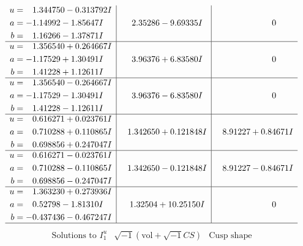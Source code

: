 \documentclass[1p]{elsarticle_modified}
\theoremstyle{definition}
\newcommand{\I}{\sqrt{-1}}
\begin{document}
$$\begin{array}{c|c|c}
\begin{aligned}
u &= \phantom{-}1.344750 - 0.313792 I \\
a &= -1.14992 - 1.85647 I \\
b &= \phantom{-}1.16266 - 1.37871 I\end{aligned}
 & \phantom{-}2.35286 - 9.69335 I & \phantom{-0.000000 } 0 \\ \hline\begin{aligned}
u &= \phantom{-}1.356540 + 0.264667 I \\
a &= -1.17529 + 1.30491 I \\
b &= \phantom{-}1.41228 + 1.12611 I\end{aligned}
 & \phantom{-}3.96376 + 6.83580 I & \phantom{-0.000000 } 0 \\ \hline\begin{aligned}
u &= \phantom{-}1.356540 - 0.264667 I \\
a &= -1.17529 - 1.30491 I \\
b &= \phantom{-}1.41228 - 1.12611 I\end{aligned}
 & \phantom{-}3.96376 - 6.83580 I & \phantom{-0.000000 } 0 \\ \hline\begin{aligned}
u &= \phantom{-}0.616271 + 0.023761 I \\
a &= \phantom{-}0.710288 + 0.110865 I \\
b &= \phantom{-}0.698856 + 0.247047 I\end{aligned}
 & \phantom{-}1.342650 + 0.121848 I & \phantom{-}8.91227 + 0.84671 I \\ \hline\begin{aligned}
u &= \phantom{-}0.616271 - 0.023761 I \\
a &= \phantom{-}0.710288 - 0.110865 I \\
b &= \phantom{-}0.698856 - 0.247047 I\end{aligned}
 & \phantom{-}1.342650 - 0.121848 I & \phantom{-}8.91227 - 0.84671 I \\ \hline\begin{aligned}
u &= \phantom{-}1.363230 + 0.273936 I \\
a &= \phantom{-}0.52798 - 1.81310 I \\
b &= -0.437436 - 0.467247 I\end{aligned}
 & \phantom{-}1.32504 + 10.25150 I & \phantom{-0.000000 } 0\\
 \hline 
 \end{array}$$\newpage$$\begin{array}{c|c|c}  
\text{Solutions to }I^u_{1}& \I (\text{vol} + \sqrt{-1}CS) & \text{Cusp shape}\\

\end{array}$$
\end{document}
